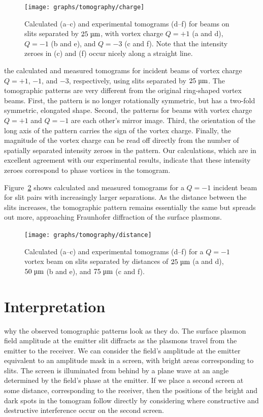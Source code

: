 \begin{figure}[tb]
\forcerectofloat\centering
\texttt{[image: graphs/tomography/charge]}
\caption{Calculated (a--c) and experimental tomograms (d--f) for beams on slits separated by $25\micron$, with vortex charge $Q = +1$ (a and d), $Q = -1$ (b and e), and $Q = -3$ (c and f).
Note that the intensity zeroes in (c) and (f) occur nicely along a straight line.}
\label{fig2}
\end{figure}%
%
 the calculated and measured tomograms for incident beams of vortex charge $Q = +1$, $-1$, and $-3$, respectively, using slits separated by $25\micron$. The tomographic patterns are very different from the original ring-shaped vortex beams. First, the pattern is no longer rotationally symmetric, but has a two-fold symmetric, elongated shape. Second, the patterns for beams with vortex charge $Q = +1$ and $Q = -1$ are each other's mirror image. Third, the orientation of the long axis of the pattern carries the sign of the vortex charge. Finally, the magnitude of the vortex charge can be read off directly from the number of spatially separated intensity zeroes in the pattern. Our calculations, which are in excellent agreement with our experimental results, indicate that these intensity zeroes correspond to phase vortices in the tomogram.

Figure~\ref{fig3} shows calculated and measured tomograms for a $Q = -1$ incident beam for slit pairs with increasingly larger separations. As the distance between the slits increases, the tomographic pattern remains essentially the same but spreads out more, approaching Fraunhofer diffraction of the surface plasmons.
%
\begin{figure}[tb]
\forceversofloat\centering
\texttt{[image: graphs/tomography/distance]}
\caption{Calculated (a--c) and experimental tomograms (d--f) for a $Q = -1$ vortex beam on slits separated by distances of $25\micron$ (a and d), $50\micron$ (b and e), and $75\micron$ (c and f).}
\label{fig3}
\end{figure}

\section{Interpretation}

 why the observed tomographic patterns look as they do.
The surface plasmon field amplitude at the emitter slit diffracts as the plasmons travel from the emitter to the receiver.
We can consider the field's amplitude at the emitter equivalent to an amplitude mask in a screen, with bright areas corresponding to slits.
The screen is illuminated from behind by a plane wave at an angle determined by the field's phase at the emitter.
If we place a second screen at some distance, corresponding to the receiver, then the positions of the bright and dark spots in the tomogram follow directly by considering where constructive and destructive interference occur on the second screen.

